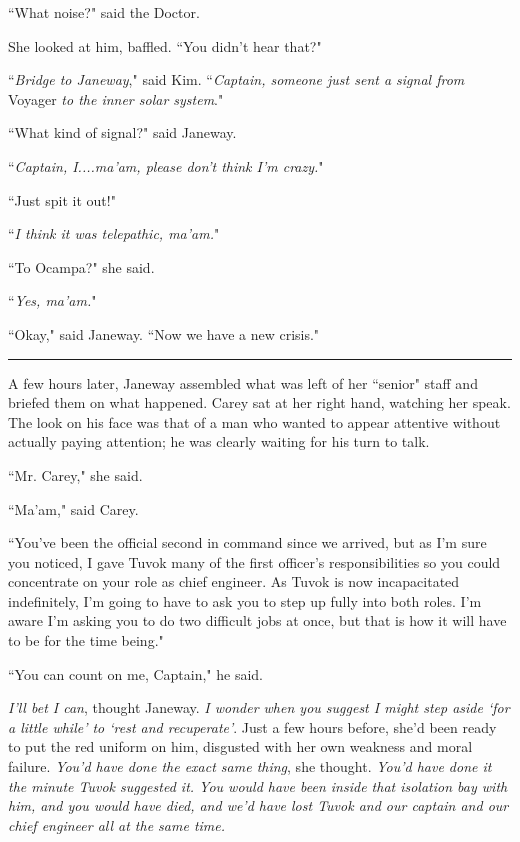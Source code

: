 \documentclass[twoside,letterpaper,12pt]{memoir}
\begin{document}
``What noise?" said the Doctor. 

She looked at him, baffled. ``You didn't hear that?" 

``\textit{Bridge to Janeway}," said Kim. ``\textit{Captain, someone just sent a signal from }Voyager\textit{ to the inner solar system}." 

``What kind of signal?" said Janeway. 

``\textit{Captain, I....ma'am, please don't think I'm crazy.}" 

``Just spit it out!" 

``\textit{I think it was telepathic, ma'am.}" 

``To Ocampa?" she said. 

``\textit{Yes, ma'am.}" 

``Okay," said Janeway. ``Now we have a new crisis." 

\begin{center}\rule{3cm}{0.4 pt}\end{center} 

A few hours later, Janeway assembled what was left of her ``senior" staff and briefed them on what happened. Carey sat at her right hand, watching her speak. The look on his face was that of a man who wanted to appear attentive without actually paying attention; he was clearly waiting for his turn to talk. 

``Mr. Carey," she said. 

``Ma'am," said Carey. 

``You've been the official second in command since we arrived, but as I'm sure you noticed, I gave Tuvok many of the first officer's responsibilities so you could concentrate on your role as chief engineer. As Tuvok is now incapacitated indefinitely, I'm going to have to ask you to step up fully into both roles. I'm aware I'm asking you to do two difficult jobs at once, but that is how it will have to be for the time being." 

``You can count on me, Captain," he said. 

\textit{I'll bet I can}, thought Janeway. \textit{I wonder when you suggest I might step aside `for a little while' to `rest and recuperate'}. Just a few hours before, she'd been ready to put the red uniform on him, disgusted with her own weakness and moral failure. \textit{You'd have done the exact same thing}, she thought. \textit{You'd have done it the minute Tuvok suggested it. You would have been inside that isolation bay with him, and you would have died, and we'd have lost Tuvok and our captain and our chief engineer all at the same time. }
\end{document}
